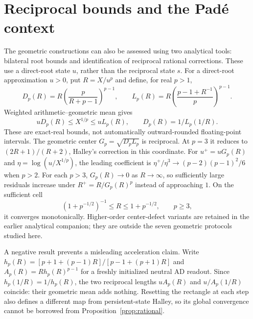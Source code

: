 \section{Reciprocal bounds and the Pad\'e context}\label{sec:context}
The geometric constructions can also be assessed using two analytical tools: bilateral root bounds and identification of reciprocal rational corrections. These use a direct-root state $u$, rather than the reciprocal state $s$. For a direct-root approximation $u>0$, put $R=X/u^p$ and define, for real $p>1$,
\begin{equation}\label{eq:bounds}
 D_p(R)=R\left(\frac p{R+p-1}\right)^{p-1},\qquad
 L_p(R)=R\left(\frac{p-1+R^{-1}}p\right)^{p-1}.
\end{equation}
Weighted arithmetic--geometric mean gives
\begin{equation}\label{eq:enclosure}
 uD_p(R)\le X^{1/p}\le uL_p(R),\qquad D_p(R)=1/L_p(1/R).
\end{equation}
These are exact-real bounds, not automatically outward-rounded floating-point intervals. The geometric center $G_p=\sqrt{D_pL_p}$ is reciprocal. At $p=3$ it reduces to $(2R+1)/(R+2)$, Halley's correction in this coordinate. For $u^+=uG_p(R)$ and $\eta=\log(u/X^{1/p})$, the leading coefficient is $\eta^+/\eta^3\to(p-2)(p-1)^2/6$ when $p>2$. For each $p>3$, $G_p(R)\to0$ as $R\to\infty$, so sufficiently large residuals increase under $R^+=R/G_p(R)^p$ instead of approaching $1$. On the sufficient cell
\[
 (1+p^{-1/2})^{-1}\le R\le1+p^{-1/2},\qquad p\ge3,
\]
it converges monotonically. Higher-order center-defect variants are retained in the earlier analytical companion; they are outside the seven geometric protocols studied here.



A negative result prevents a misleading acceleration claim. Write $h_p(R)=[p+1+(p-1)R]/[p-1+(p+1)R]$ and $A_p(R)=Rh_p(R)^{p-1}$ for a freshly initialized neutral AD readout. Since $h_p(1/R)=1/h_p(R)$, the two reciprocal lengths $uA_p(R)$ and $u/A_p(1/R)$ coincide: their geometric mean adds nothing. Resetting the rectangle at each step also defines a different map from persistent-state Halley, so its global convergence cannot be borrowed from Proposition~\ref{prop:rational}.


